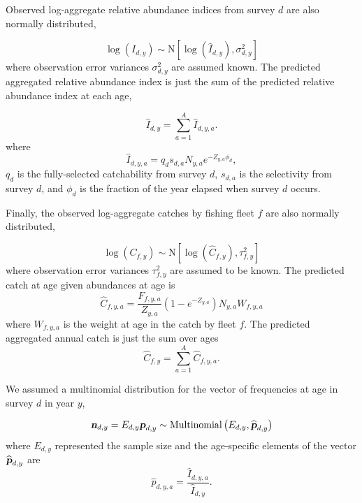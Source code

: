 \documentclass[12pt,letterpaper, leqno]{article}
\begin{document}
Observed log-aggregate relative abundance indices from survey $d$ are also normally distributed,

\vspace{-12pt}
\begin{equation*}
 \log\left(I_{d,y}\right) \sim \text{N}\left[\log\left(\widehat I_{d,y}\right), \sigma^2_{d,y}\right]
\end{equation*}
where observation error variances $\sigma^2_{d,y}$ are assumed known. The predicted aggregated relative abundance index is just the sum of the predicted relative abundance index at each age,

\vspace{-12pt}
\begin{equation*}
\widehat I_{d,y} = \sum^A_{a=1} \widehat I_{d,y,a}.
\end{equation*}
where
\vspace{-12pt}
\begin{equation*}
\widehat I_{d,y,a} = q_d s_{d,a} N_{y,a} e^{- Z_{y,a} \phi_d}, 
\end{equation*}
$q_d$ is the fully-selected catchability from survey $d$, $s_{d,a}$ is the selectivity from survey $d$, and $\phi_d$ is the fraction of the year elapsed when survey $d$ occurs. 

Finally, the observed log-aggregate catches by fishing fleet $f$ are also normally distributed,

\vspace{-12pt}
\begin{equation*}
\log\left(C_{f,y}\right) \sim \text{N}\left[\log\left(\widehat C_{f,y}\right), \tau^2_{f,y}\right]
\end{equation*}
where observation error variances $\tau^2_{f,y}$ are assumed to be known. The predicted catch at age given abundances at age is
\begin{equation}\label{pred.caa}
\widehat C_{f,y,a} = \frac{F_{f,y,a}}{Z_{y,a}}\left(1 - e^{-Z_{y,a}}\right) N_{y,a} W_{f,y,a}
\end{equation}
where $W_{f,y,a}$ is the weight at age in the catch by fleet $f$. The predicted aggregated annual catch is just the sum over ages
\begin{equation}\label{pred.catch}
\widehat C_{f,y} = \sum^A_{a=1} \widehat C_{f,y,a}.
\end{equation}

We assumed a multinomial distribution for the vector of frequencies at age in survey $d$ in year $y$, 

\vspace{-12pt}
\begin{equation}\label{multinom.dist}
\textbf{\textsl{n}}_{d,y} = E_{d,y} \textsl{\textbf{p}}_{d,y} \sim \text{Multinomial}\left(E_{d,y}, \widehat {\textsl{\textbf{p}}} _{d,y}\right)
\end{equation}
where $E_{d,y}$ represented the sample size and the age-specific elements of the vector $\widehat {\textsl{\textbf{p}}} _{d,y}$ are
\vspace{-12pt}
\begin{equation*}
  \widehat p_{d,y,a} = \frac{\widehat I_{d,y,a}}{\widehat I_{d,y}}.
\end{equation*}
\end{document}
